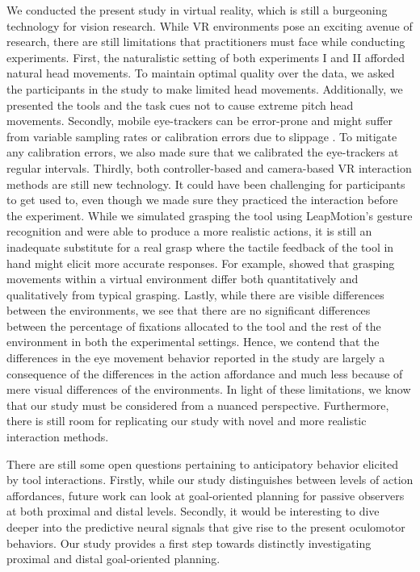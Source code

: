 We conducted the present study in virtual reality, which is still a burgeoning technology for vision research. While VR environments pose an exciting avenue of research, there are still limitations that practitioners must face while conducting experiments. First, the naturalistic setting of both experiments I and II afforded natural head movements. To maintain optimal quality over the data, we asked the participants in the study to make limited head movements. Additionally, we presented the tools and the task cues not to cause extreme pitch head movements. Secondly, mobile eye-trackers can be error-prone and might suffer from variable sampling rates \citep{Ehinger2019-xr} or calibration errors due to slippage \citep{Niehorster2020-yq}. To mitigate any calibration errors, we also made sure that we calibrated the eye-trackers at regular intervals. Thirdly, both controller-based and camera-based VR interaction methods are still new technology. It could have been challenging for participants to get used to, even though we made sure they practiced the interaction before the experiment. While we simulated grasping the tool using LeapMotion’s gesture recognition and were able to produce a more realistic actions, it is still an inadequate substitute for a real grasp where the tactile feedback of the tool in hand might elicit more accurate responses. For example,\citet{Ozana2018-ih} showed that grasping movements within a virtual environment differ both quantitatively and qualitatively from typical grasping. Lastly, while there are visible differences between the environments, we see that there are no significant differences between the percentage of fixations allocated to the tool and the rest of the environment in both the experimental settings. Hence, we contend that the differences in the eye movement behavior reported in the study are largely a consequence of the differences in the action affordance and much less because of mere visual differences of the environments. In light of these limitations, we know that our study must be considered from a nuanced perspective. Furthermore, there is still room for replicating our study with novel and more realistic interaction methods.

There are still some open questions pertaining to anticipatory behavior elicited by tool interactions. Firstly, while our study distinguishes between levels of action affordances, future work can look at goal-oriented planning for passive observers at both proximal and distal levels. Secondly, it would be interesting to dive deeper into the predictive neural signals that give rise to the present oculomotor behaviors. Our study provides a first step towards distinctly investigating proximal and distal goal-oriented planning.

